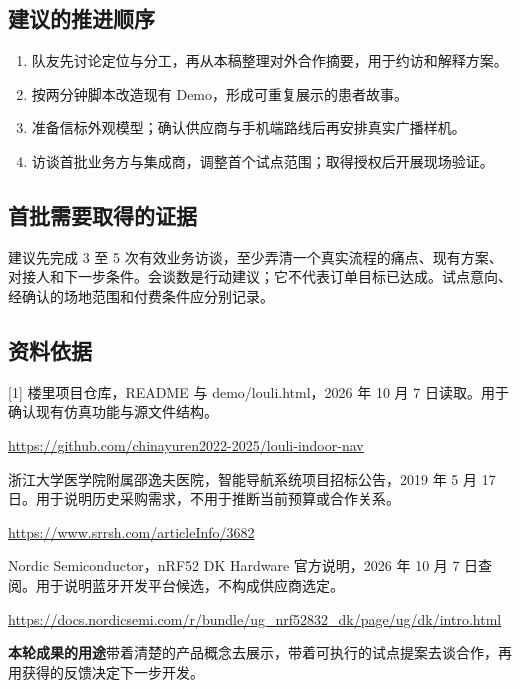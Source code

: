 \documentclass[UTF8,11pt,fontset=fandol]{ctexart}
\newcommand{\lead}[1]{\vspace{4pt}\colorbox{pale}{\parbox{\dimexpr\linewidth-16pt\relax}{\vspace{6pt}\color{ink}#1\vspace{6pt}}}\par\vspace{4pt}}
\begin{document}
\subsection*{建议的推进顺序}
\begin{enumerate}
\item 队友先讨论定位与分工，再从本稿整理对外合作摘要，用于约访和解释方案。
\item 按两分钟脚本改造现有 Demo，形成可重复展示的患者故事。
\item 准备信标外观模型；确认供应商与手机端路线后再安排真实广播样机。
\item 访谈首批业务方与集成商，调整首个试点范围；取得授权后开展现场验证。
\end{enumerate}
\subsection*{首批需要取得的证据}
建议先完成 3 至 5 次有效业务访谈，至少弄清一个真实流程的痛点、现有方案、对接人和下一步条件。会谈数是行动建议；它不代表订单目标已达成。试点意向、经确认的场地范围和付费条件应分别记录。
\subsection*{资料依据}
{\footnotesize
[1] 楼里项目仓库，README 与 demo/louli.html，2026 年 10 月 7 日读取。用于确认现有仿真功能与源文件结构。\par
\url{https://github.com/chinayuren2022-2025/louli-indoor-nav}\par
[2] 浙江大学医学院附属邵逸夫医院，智能导航系统项目招标公告，2019 年 5 月 17 日。用于说明历史采购需求，不用于推断当前预算或合作关系。\par
\url{https://www.srrsh.com/articleInfo/3682}\par
[3] Nordic Semiconductor，nRF52 DK Hardware 官方说明，2026 年 10 月 7 日查阅。用于说明蓝牙开发平台候选，不构成供应商选定。\par
\url{https://docs.nordicsemi.com/r/bundle/ug_nrf52832_dk/page/ug/dk/intro.html}\par}
\vfill
\lead{\textbf{本轮成果的用途}\quad 带着清楚的产品概念去展示，带着可执行的试点提案去谈合作，再用获得的反馈决定下一步开发。}
\end{document}

